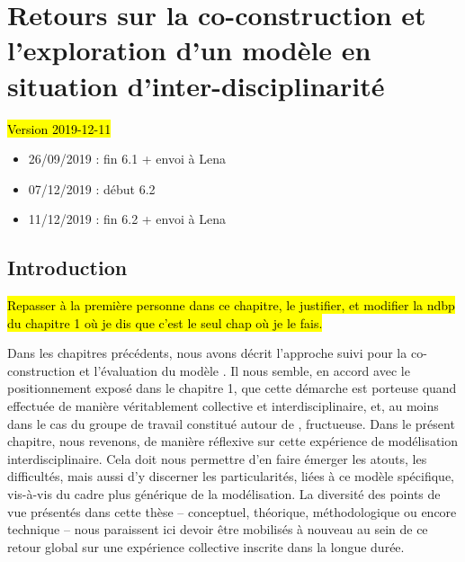 \setcounter{chapter}{5}
\graphicspath{{chap6/}}

\chapter{Retours sur la co-construction et l'exploration d'un modèle en situation d'inter-disciplinarité}
\label{chap:chap6}
\vspace*{-2.5em}
\begin{center}
	{\large \hl{Version 2019-12-11}}
\end{center}
\vspace*{-1em}
\begin{itemize}
	\item 26/09/2019 : fin 6.1 + envoi à Lena
	\item 07/12/2019 : début 6.2
	\item 11/12/2019 : fin 6.2 + envoi à Lena
\end{itemize} 
\vspace*{-1em}
\setcounter{minitocdepth}{2}
\minitoc
\clearpage
{}

\section*{Introduction}

\begin{center}
	\hl{Repasser à la première personne dans ce chapitre, le justifier, et modifier la ndbp du chapitre 1 où je dis que c'est le seul chap où je le fais.}
\end{center}

Dans les chapitres précédents, nous avons décrit l'approche suivi pour la co-construction et l'évaluation du modèle \simfeodal{}.
Il nous semble, en accord avec le positionnement exposé dans le chapitre 1, que cette démarche est porteuse quand effectuée de manière véritablement collective et interdisciplinaire, et, au moins dans le cas du groupe de travail constitué autour de \simfeodal{}, fructueuse.
Dans le présent chapitre, nous revenons, de manière réflexive sur cette expérience de modélisation interdisciplinaire.
Cela doit nous permettre d'en faire émerger les atouts, les difficultés, mais aussi d'y discerner les particularités, liées à ce modèle spécifique, vis-à-vis du cadre plus générique de la modélisation.
La diversité des points de vue présentés dans cette thèse -- conceptuel, théorique, méthodologique ou encore technique -- nous paraissent ici devoir être mobilisés à nouveau au sein de ce retour global sur une expérience collective inscrite dans la longue durée.


